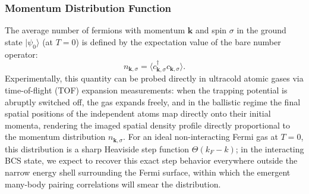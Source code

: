 \subsubsection{Momentum Distribution Function}

The average number of fermions with momentum \( \mathbf{k} \) and spin \( \sigma \) in the ground state \( |\psi_0\rangle \) (at \( T = 0 \)) is defined by the expectation value of the bare number operator:
\[
    n_{\mathbf{k},\sigma} = \langle c_{\mathbf{k},\sigma}^\dagger c_{\mathbf{k},\sigma} \rangle.
\]
Experimentally, this quantity can be probed directly in ultracold atomic gases via time-of-flight (TOF) expansion measurements: when the trapping potential is abruptly switched off, the gas expands freely, and in the ballistic regime the final spatial positions of the independent atoms map directly onto their initial momenta, rendering the imaged spatial density profile directly proportional to the momentum distribution \( n_{\mathbf{k},\sigma} \). For an ideal non-interacting Fermi gas at \( T = 0 \), this distribution is a sharp Heaviside step function \( \Theta(k_F - k) \); in the interacting BCS state, we expect to recover this exact step behavior everywhere outside the narrow energy shell surrounding the Fermi surface, within which the emergent many-body pairing correlations will smear the distribution.

